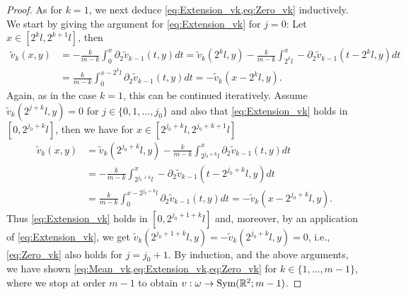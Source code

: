\documentclass[a4paper, 10pt, twoside, notitlepage]{amsart}
\theoremstyle{plain}
\newcommand{\R}{\mathbb{R}}
\newcommand{\p}{\partial}
\begin{document}
\begin{proof}
                          As for $k=1$, we next deduce \cref{eq:Extension_vk,eq:Zero_vk} inductively.
                          We start by giving the argument for \cref{eq:Extension_vk} for $j=0$: Let $x \in [2^kl,2^{k+1}l]$, then
                          \begin{align*}
                            \tilde{v}_k(x,y) &= -\frac{k}{m-k} \int_0^x \p_2 \tilde{v}_{k-1}(t,y) dt = \tilde{v}_k(2^kl,y) - \frac{k}{m-k} \int_{2^kl}^x - \p_2 \tilde{v}_{k-1}(t-2^kl,y)dt \\
                            & = \frac{k}{m-k} \int_0^{x-2^kl} \p_2 \tilde{v}_{k-1}(t,y) dt = - \tilde{v}_k(x-2^kl,y).
                          \end{align*}
                          Again, as in the case $k=1$, this can be continued iteratively. Assume $\tilde{v}_k(2^{j+k}l,y)=0$ for $j\in\{0,1,\dots,j_0\}$ and also that \cref{eq:Extension_vk} holds in $[0,2^{j_0+k}l]$, then we have for $x \in [2^{j_0+k}l,2^{j_0+k+1}l]$
                          \begin{align*}
                            \tilde{v}_k(x,y) &= \tilde{v}_k(2^{j_0+k}l,y) - \frac{k}{m-k} \int_{2^{j_0+k}l}^x \p_2 \tilde{v}_{k-1}(t,y) dt \\
                            &= - \frac{k}{m-k} \int_{2^{j_0+k}l}^x - \p_2 \tilde{v}_{k-1}(t-2^{j_0+k}l,y) dt \\
                            & = \frac{k}{m-k} \int_{0}^{x-2^{j_0+k}l} \p_2 \tilde{v}_{k-1}(t,y) dt = - \tilde{v}_k(x-2^{j_0+k}l,y).
                          \end{align*}
                          Thus \cref{eq:Extension_vk} holds in $[0,2^{j_0+1+k}l]$ and, moreover, by an application of \cref{eq:Extension_vk}, we get $\tilde{v}_k(2^{j_0+1+k}l,y) = - \tilde{v}_k(2^{j_0+k}l,y) = 0$, i.e., \cref{eq:Zero_vk} also holds for $j=j_0+1$.
                          By induction, and the above arguments, we have shown \cref{eq:Mean_vk,eq:Extension_vk,eq:Zero_vk} for $k\in\{1,\dots,m-1\}$, where we stop at order $m-1$ to obtain $v: \omega \to \textup{Sym}(\R^2;m-1)$.
                        



\end{proof}
\end{document}
